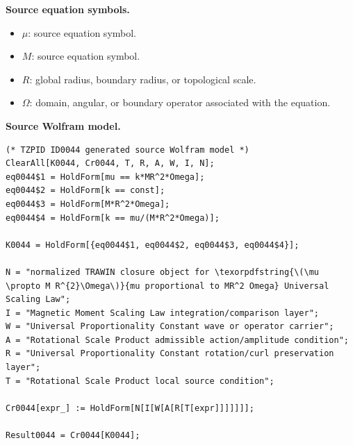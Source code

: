 \begin{minipage}[t]{0.49\linewidth}
\begingroup
\small
\raggedright
\textbf{Source equation symbols.}\par
\begin{itemize}[leftmargin=1.35em,itemsep=1pt,topsep=1pt,parsep=0pt]
    \item $\mu$: source equation symbol.
    \item $M$: source equation symbol.
    \item $R$: global radius, boundary radius, or topological scale.
    \item $\Omega$: domain, angular, or boundary operator associated with the equation.
\end{itemize}
\endgroup
\end{minipage}\hfill
\begin{minipage}[t]{0.47\linewidth}
\begingroup
\scriptsize
\raggedright
\textbf{Source Wolfram model.}\par
\begin{Verbatim}[fontsize=\tiny,breaklines=true,breakanywhere=true]
(* TZPID ID0044 generated source Wolfram model *)
ClearAll[K0044, Cr0044, T, R, A, W, I, N];
eq0044$1 = HoldForm[mu == k*MR^2*Omega];
eq0044$2 = HoldForm[k == const];
eq0044$3 = HoldForm[M*R^2*Omega];
eq0044$4 = HoldForm[k == mu/(M*R^2*Omega)];

K0044 = HoldForm[{eq0044$1, eq0044$2, eq0044$3, eq0044$4}];

N = "normalized TRAWIN closure object for \texorpdfstring{\(\mu \propto M R^{2}\Omega\)}{mu proportional to MR^2 Omega} Universal Scaling Law";
I = "Magnetic Moment Scaling Law integration/comparison layer";
W = "Universal Proportionality Constant wave or operator carrier";
A = "Rotational Scale Product admissible action/amplitude condition";
R = "Universal Proportionality Constant rotation/curl preservation layer";
T = "Rotational Scale Product local source condition";

Cr0044[expr_] := HoldForm[N[I[W[A[R[T[expr]]]]]]];

Result0044 = Cr0044[K0044];
\end{Verbatim}
\endgroup
\end{minipage}

